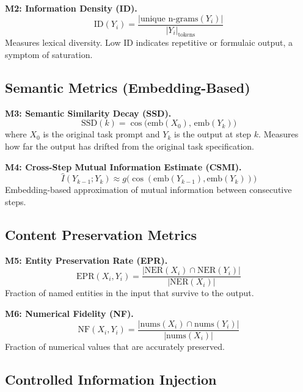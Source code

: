 \documentclass[conference]{IEEEtran}
\begin{document}
\textbf{M2: Information Density (ID).}
\begin{equation}
    \text{ID}(Y_i) = \frac{|\text{unique n-grams}(Y_i)|}{|Y_i|_{\text{tokens}}}
\end{equation}
Measures lexical diversity. Low ID indicates repetitive or formulaic output, a symptom of saturation.

\subsection{Semantic Metrics (Embedding-Based)}

\textbf{M3: Semantic Similarity Decay (SSD).}
\begin{equation}
    \text{SSD}(k) = \cos\bigl(\text{emb}(X_0),\, \text{emb}(Y_k)\bigr)
\end{equation}
where $X_0$ is the original task prompt and $Y_k$ is the output at step $k$.
Measures how far the output has drifted from the original task specification.

\textbf{M4: Cross-Step Mutual Information Estimate (CSMI).}
\begin{equation}
    \hat{I}(Y_{k-1}; Y_k) \approx g\bigl(\cos(\text{emb}(Y_{k-1}), \text{emb}(Y_k))\bigr)
\end{equation}
Embedding-based approximation of mutual information between consecutive steps.

\subsection{Content Preservation Metrics}

\textbf{M5: Entity Preservation Rate (EPR).}
\begin{equation}
    \text{EPR}(X_i, Y_i) = \frac{|\text{NER}(X_i) \cap \text{NER}(Y_i)|}{|\text{NER}(X_i)|}
\end{equation}
Fraction of named entities in the input that survive to the output.

\textbf{M6: Numerical Fidelity (NF).}
\begin{equation}
    \text{NF}(X_i, Y_i) = \frac{|\text{nums}(X_i) \cap \text{nums}(Y_i)|}{|\text{nums}(X_i)|}
\end{equation}
Fraction of numerical values that are accurately preserved.

\subsection{Controlled Information Injection}
\end{document}
